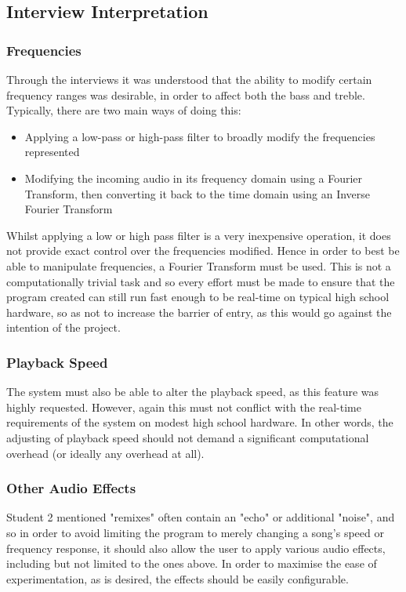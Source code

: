 \documentclass{article}
\begin{document}
	\subsection{Interview Interpretation}
	\subsubsection{Frequencies}
	Through the interviews it was understood that the ability to modify certain frequency ranges was desirable, in order to affect both the bass and treble. Typically, there are two main ways of doing this:
	\begin{itemize}
		\item Applying a low-pass or high-pass filter to broadly modify the frequencies represented
		\item Modifying the incoming audio in its frequency domain using a Fourier Transform, then converting it back to the time domain using an Inverse Fourier Transform
	\end{itemize}
	Whilst applying a low or high pass filter is a very inexpensive operation, it does not provide exact control over the frequencies modified. Hence in order to best be able to manipulate frequencies, a Fourier Transform must be used.  This is not a computationally trivial task and so every effort must be made to ensure that the program created can still run fast enough to be real-time on typical high school hardware, so as not to increase the barrier of entry, as this would go against the intention of the project.
	
	\subsubsection{Playback Speed}
	The system must also be able to alter the playback speed, as this feature was highly requested. However, again this must not conflict with the real-time requirements of the system on modest high school hardware. In other words, the adjusting of playback speed should not demand a significant computational overhead (or ideally any overhead at all).
	
	\subsubsection{Other Audio Effects}
	Student 2 mentioned "remixes" often contain an "echo" or additional "noise", and so in order to avoid limiting the program to merely changing a song's speed or frequency response, it should also allow the user to apply various audio effects, including but not limited to the ones above. In order to maximise the ease of experimentation, as is desired, the effects should be easily configurable.
		
\end{document}
